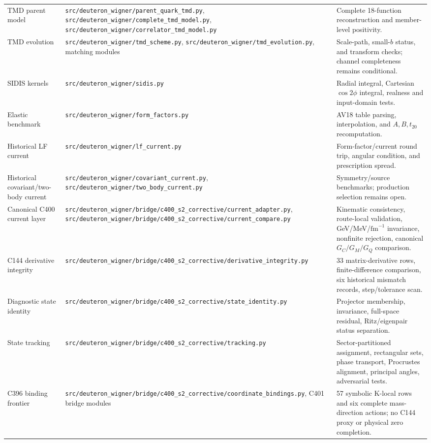 \documentclass[11pt,oneside]{book}
\newcommand{\fm}{\mathrm{fm}}
\newcommand{\codepath}[1]{\nolinkurl{#1}}
\begin{document}
\begin{longtable}{p{}p{}p{}}
TMD parent model&\codepath{src/deuteron_wigner/parent_quark_tmd.py}, \codepath{src/deuteron_wigner/complete_tmd_model.py}, \codepath{src/deuteron_wigner/correlator_tmd_model.py}&Complete 18-function reconstruction and member-level positivity.\\
TMD evolution&\codepath{src/deuteron_wigner/tmd_scheme.py}, \codepath{src/deuteron_wigner/tmd_evolution.py}, matching modules&Scale-path, small-$b$ status, and transform checks; channel completeness remains conditional.\\
SIDIS kernels&\codepath{src/deuteron_wigner/sidis.py}&Radial integral, Cartesian $\cos2\phi$ integral, realness and input-domain tests.\\
Elastic benchmark&\codepath{src/deuteron_wigner/form_factors.py}&AV18 table parsing, interpolation, and $A,B,t_{20}$ recomputation.\\
Historical LF current&\codepath{src/deuteron_wigner/lf_current.py}&Form-factor/current round trip, angular condition, and prescription spread.\\
Historical covariant/two-body current&\codepath{src/deuteron_wigner/covariant_current.py}, \codepath{src/deuteron_wigner/two_body_current.py}&Symmetry/source benchmarks; production selection remains open.\\
Canonical C400 current layer&\codepath{src/deuteron_wigner/bridge/c400_s2_corrective/current_adapter.py}, \codepath{src/deuteron_wigner/bridge/c400_s2_corrective/current_compare.py}&Kinematic consistency, route-local validation, GeV/MeV/$\fm^{-1}$ invariance, nonfinite rejection, canonical $G_C/G_M/G_Q$ comparison.\\
C144 derivative integrity&\codepath{src/deuteron_wigner/bridge/c400_s2_corrective/derivative_integrity.py}&33 matrix-derivative rows, finite-difference comparison, six historical mismatch records, step/tolerance scan.\\
Diagnostic state identity&\codepath{src/deuteron_wigner/bridge/c400_s2_corrective/state_identity.py}&Projector membership, invariance, full-space residual, Ritz/eigenpair status separation.\\
State tracking&\codepath{src/deuteron_wigner/bridge/c400_s2_corrective/tracking.py}&Sector-partitioned assignment, rectangular sets, phase transport, Procrustes alignment, principal angles, adversarial tests.\\
C396 binding frontier&\codepath{src/deuteron_wigner/bridge/c400_s2_corrective/coordinate_bindings.py}, C401 bridge modules&57 symbolic K-local rows and six complete mass-direction actions; no C144 proxy or physical zero completion.\\

\end{longtable}
\end{document}
